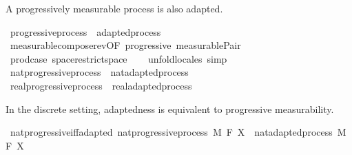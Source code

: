 \begin{isabellebody}
\isamarkupfalse%
%
\begin{isamarkuptext}%
A progressively measurable process is also adapted.%
\end{isamarkuptext}\isamarkuptrue%
\isamarkupfalse%
\ progressive{\isacharunderscore}{\kern0pt}process\ {\isasymsubseteq}\ adapted{\isacharunderscore}{\kern0pt}process%
\isadelimproof
\ %
\endisadelimproof
%
\isatagproof
{}\isamarkupfalse%
\ measurable{\isacharunderscore}{\kern0pt}compose{\isacharunderscore}{\kern0pt}rev{\isacharbrackleft}{\kern0pt}OF\ progressive\ measurable{\isacharunderscore}{\kern0pt}Pair{}{\isacharprime}{\kern0pt}{\isacharbrackright}{\kern0pt}\ \isanewline
\ \ \isamarkupfalse%
\ prod{\isachardot}{\kern0pt}case\ space{\isacharunderscore}{\kern0pt}restrict{\isacharunderscore}{\kern0pt}space\isanewline
\ \ \isamarkupfalse%
\ unfold{\isacharunderscore}{\kern0pt}locales\ simp%
\endisatagproof
{\isafoldproof}%
%
\isadelimproof
%
\endisadelimproof
\isanewline
\isanewline
{}\isamarkupfalse%
\ nat{\isacharunderscore}{\kern0pt}progressive{\isacharunderscore}{\kern0pt}process\ {\isasymsubseteq}\ nat{\isacharunderscore}{\kern0pt}adapted{\isacharunderscore}{\kern0pt}process%
\isadelimproof
\ %
\endisadelimproof
%
\isatagproof
\isacommand{{\isachardot}{\kern0pt}{\isachardot}{\kern0pt}}\isamarkupfalse%
%
\endisatagproof
{\isafoldproof}%
%
\isadelimproof
%
\endisadelimproof
\isanewline
{}\isamarkupfalse%
\ real{\isacharunderscore}{\kern0pt}progressive{\isacharunderscore}{\kern0pt}process\ {\isasymsubseteq}\ real{\isacharunderscore}{\kern0pt}adapted{\isacharunderscore}{\kern0pt}process%
\isadelimproof
\ %
\endisadelimproof
%
\isatagproof
\isacommand{{\isachardot}{\kern0pt}{\isachardot}{\kern0pt}}\isamarkupfalse%
%
\endisatagproof
{\isafoldproof}%
%
\isadelimproof
%
\endisadelimproof
%
\begin{isamarkuptext}%
In the discrete setting, adaptedness is equivalent to progressive measurability.%
\end{isamarkuptext}\isamarkuptrue%
\isamarkupfalse%
\ nat{\isacharunderscore}{\kern0pt}progressive{\isacharunderscore}{\kern0pt}iff{\isacharunderscore}{\kern0pt}adapted{\isacharcolon}{\kern0pt}\ {\isachardoublequoteopen}nat{\isacharunderscore}{\kern0pt}progressive{\isacharunderscore}{\kern0pt}process\ M\ F\ X\ {\isasymlongleftrightarrow}\ nat{\isacharunderscore}{\kern0pt}adapted{\isacharunderscore}{\kern0pt}process\ M\ F\ X{\isachardoublequoteclose}\isanewline

\end{isabellebody}

